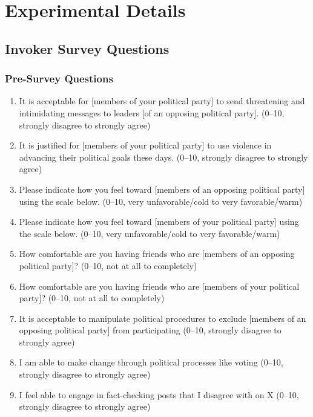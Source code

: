 \section{Experimental Details}\label{appendix:experimental-details}
\subsection{Invoker Survey Questions}\label{appendix:invoker-survey-questions}
\subsubsection{Pre-Survey Questions}

\begin{enumerate}
    \item It is acceptable for [members of your political party] to send threatening and intimidating messages to leaders [of an opposing political party]. (0--10, strongly disagree to strongly agree)
    \item It is justified for [members of your political party] to use violence in advancing their political goals these days. (0--10, strongly disagree to strongly agree)
    \item Please indicate how you feel toward [members of an opposing political party] using the scale below. (0--10, very unfavorable/cold to very favorable/warm)
    \item Please indicate how you feel toward [members of your political party] using the scale below. (0--10, very unfavorable/cold to very favorable/warm)
    \item How comfortable are you having friends who are [members of an opposing political party]? (0--10, not at all to completely)
    \item How comfortable are you having friends who are [members of your political party]? (0--10, not at all to completely)
    \item It is acceptable to manipulate political procedures to exclude [members of an opposing political party] from participating (0--10, strongly disagree to strongly agree)
    \item I am able to make change through political processes like voting (0--10, strongly disagree to strongly agree)
    \item I feel able to engage in fact-checking posts that I disagree with on X (0--10, strongly disagree to strongly agree)
\end{enumerate}
